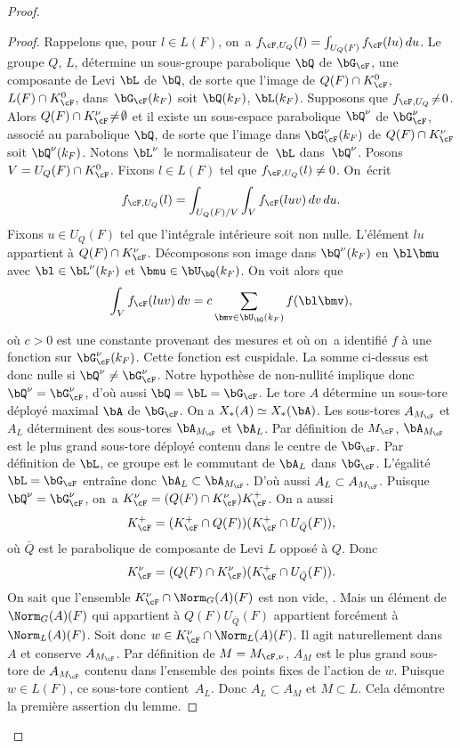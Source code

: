 \begin{proof}
\begin{proof}
Rappelons que, pour $l\in L(F)$, on~a $f_{\cF,U_{Q}}(l)=\int_{U_{Q}(F)}f_{\cF}(lu)\,du$. Le groupe $Q$, \resp $L$, détermine un sous-groupe parabolique $\bQ$ de $\bG_{\cF}$, \resp une composante de Levi $\bL$ de $\bQ$, de sorte que l'image de $Q(F)\cap K_{\cF}^0$, \resp $L(F)\cap K_{\cF}^0$, dans~$\bG_{\cF}(k_{F})$ soit $\bQ(k_{F})$, \resp $\bL(k_{F})$. Supposons que $f_{\cF,U_{Q}}\!\neq\!0$. Alors $Q(F)\cap K_{\cF}^{\nu}\!\neq\!\emptyset$ et il existe un sous-espace parabolique $\bQ^{\nu}$ de $\bG^{\nu}_{\cF}$, associé au parabolique $\bQ$, de sorte que l'image dans $\bG^{\nu}_{\cF}(k_{F})$ de $Q(F)\cap K_{\cF}^{\nu}$ soit $\bQ^{\nu}(k_{F})$. Notons $\bL^{\nu}$ le normalisateur de~$\bL$ dans~$\bQ^{\nu}$. Posons $V=U_{Q}(F)\cap K_{\cF}^0$. Fixons $l\in L(F)$ tel que $f_{\cF,U_{Q}}(l)\neq0$. On~écrit
\[
f_{\cF,U_{Q}}(l)=\int_{U_{Q}(F)/V}\int_{V}f_{\cF}(luv)\,dv\,du.
\]
Fixons $u\in U_{Q}(F)$ tel que l'intégrale intérieure soit non nulle. L'élément $lu$ appartient à $Q(F)\cap K_{\cF}^{\nu}$. Décomposons son image dans $\bQ^{\nu}(k_{F})$ en $\bl\bmu$ avec $\bl\in \bL^{\nu}(k_{F})$ et $\bmu\in \bU_{\bQ}(k_{F})$. On voit alors que
\[
\int_{V}f_{\cF}(luv)\,dv=c\sum_{\bmv\in \bU_{\bQ}(k_{F})}f(\bl\bmv),
\]
où $c>0$ est une constante provenant des mesures et où on~a identifié $f$ à une fonction sur $\bG^{\nu}_{\cF}(k_{F})$. Cette fonction est cuspidale. La somme ci-dessus est donc nulle si $\bQ^{\nu}\neq\bG_{\cF}^{\nu}$. Notre hypothèse de non-nullité implique donc $\bQ^{\nu}=\bG_{\cF}^{\nu}$, d'où aussi $\bQ=\bL=\bG_{\cF}$. Le tore $A$ détermine un sous-tore déployé maximal $\bA$ de $\bG_{\cF}$. On a $X_{*}(A)\simeq X_{*}(\bA)$. Les sous-tores $A_{M_{\cF}}$ et $A_{L}$ déterminent des sous-tores $\bA_{M_{\cF}}$ et $\bA_{L}$. Par définition de $M_{\cF}$, $\bA_{M_{\cF}}$ est le plus grand sous-tore déployé contenu dans le centre de $\bG_{\cF}$. Par définition de $\bL$, ce groupe est le commutant de $\bA_{L}$ dans $\bG_{\cF}$. L'égalité $\bL=\bG_{\cF}$ entraîne donc $\bA_{L}\subset \bA_{M_\cF}$. D'où aussi $A_{L}\subset A_{M_{\cF}}$. Puisque $\bQ^{\nu}=\bG_{\cF}^{\nu}$, on~a $K_{\cF}^{\nu}=(Q(F)\cap K_{\cF}^{\nu})K_{\cF}^+$. On a aussi
\[
K_{\cF}^+=(K_{\cF}^+\cap Q(F))(K_{\cF}^+\cap U_{\bar{Q}}(F)),
\]
où $\bar{Q}$ est le parabolique de composante de Levi $L$ opposé à $Q$. Donc
\[
K_{\cF}^{\nu}=(Q(F)\cap K_{\cF}^{\nu})(K_{\cF}^+\cap U_{\bar{Q}}(F)).
\]
On sait que l'ensemble $K_{\cF}^{\nu}\cap \Norm_{G}(A)(F)$ est non vide, \cf \cite[7.4.4]{BT}. Mais un élément de $\Norm_{G}(A)(F)$ qui appartient à $Q(F)U_{\bar{Q}}(F)$ appartient forcément à $\Norm_{L}(A)(F)$. Soit donc $w\in K_{\cF}^{\nu}\cap \Norm_{L}(A)(F)$. Il agit naturellement dans $A$ et conserve $A_{M_{\cF}}$. Par définition de $M=M_{\cF,\nu}$, $A_{M}$ est le plus grand sous-tore de $A_{M_{\cF}}$ contenu dans l'ensemble des points fixes de l'action de $w$. Puisque $w\in L(F)$, ce sous-tore contient~$A_{L}$. Donc $A_{L}\subset A_{M}$ et $M\subset L$. Cela démontre la première assertion du lemme.


\end{proof}
\end{proof}
